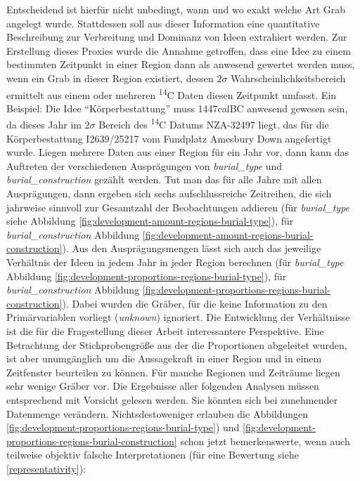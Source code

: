 \documentclass[openany,twoside,twocolumn]{book}
\begin{document}
Entscheidend ist hierfür nicht unbedingt, wann und wo exakt welche Art
Grab angelegt wurde. Stattdessen soll aus dieser Information eine
quantitative Beschreibung zur Verbreitung und Dominanz von Ideen
extrahiert werden. Zur Erstellung dieses Proxies wurde die Annahme
getroffen, dass eine Idee zu einem bestimmten Zeitpunkt in einer Region
dann als anwesend gewertet werden muss, wenn ein Grab in dieser Region
existiert, dessen \(2\sigma\) Wahrscheinlichkeitsbereich ermittelt aus
einem oder mehreren \textsuperscript{14}C Daten diesen Zeitpunkt
umfasst. Ein Beispiel: Die Idee ``Körperbestattung'' muss 1447calBC
anwesend gewesen sein, da dieses Jahr im \(2\sigma\) Bereich des
\textsuperscript{14}C Datums NZA-32497 liegt, das für die
Körperbestattung I2639/25217 vom Fundplatz Amesbury Down angefertigt
wurde. Liegen mehrere Daten aus einer Region für ein Jahr vor, dann kann
das Auftreten der verschiedenen Ausprägungen von \emph{burial\_type} und
\emph{burial\_construction} gezählt werden. Tut man das für alle Jahre
mit allen Ausprägungen, dann ergeben sich sechs aufschlussreiche
Zeitreihen, die sich jahrweise sinnvoll zur Gesamtzahl der Beobachtungen
addieren (für \emph{burial\_type} siehe Abbildung
\ref{fig:development-amount-regions-burial-type}), für
\emph{burial\_construction} Abbildung
\ref{fig:development-amount-regions-burial-construction}). Aus den
Ausprägungsmengen lässt sich auch das jeweilige Verhältnis der Ideen in
jedem Jahr in jeder Region berechnen (für \emph{burial\_type} Abbildung
\ref{fig:development-proportions-regions-burial-type}), für
\emph{burial\_construction} Abbildung
\ref{fig:development-proportions-regions-burial-construction}). Dabei
wurden die Gräber, für die keine Information zu den Primärvariablen
vorliegt (\emph{unknown}) ignoriert. Die Entwicklung der Verhältnisse
ist die für die Fragestellung dieser Arbeit interessantere Perspektive.
Eine Betrachtung der Stichprobengröße aus der die Proportionen
abgeleitet wurden, ist aber unumgänglich um die Aussagekraft in einer
Region und in einem Zeitfenster beurteilen zu können. Für manche
Regionen und Zeiträume liegen sehr wenige Gräber vor. Die Ergebnisse
aller folgenden Analysen müssen entsprechend mit Vorsicht gelesen
werden. Sie könnten sich bei zunehmender Datenmenge verändern.
Nichtsdestoweniger erlauben die Abbildungen
\ref{fig:development-proportions-regions-burial-type}) und
\ref{fig:development-proportions-regions-burial-construction} schon
jetzt bemerkenswerte, wenn auch teilweise objektiv falsche
Interpretationen (für eine Bewertung siehe \ref{representativity}):
\end{document}

